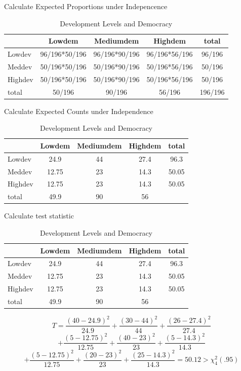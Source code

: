 \documentclass{beamer}
\numberwithin{equation}{section}
\begin{document}
\begin{frame}{Calculate Expected Proportions under Indepencence}
\begin{table}[htdp]
\caption{Development Levels and Democracy}
\begin{center}
\begin{tabular}{l|ccc|c}
\hline
&Lowdem &Mediumdem &Highdem &total\\
\hline
Lowdev& 96/196*50/196&96/196*90/196& 96/196*56/196&96/196\\
Meddev&50/196*50/196&50/196*90/196& 50/196*56/196& 50/196\\
Highdev &50/196*50/196&50/196*90/196& 50/196*56/196& 50/196\\
\hline 
total &50/196& 90/196& 56/196& 196/196
\end{tabular}
\end{center}
\end{table}
\end{frame}

\begin{frame}{Calculate Expected Counts under Independence}
\begin{table}[htdp]
\caption{Development Levels and Democracy}
\begin{center}
\begin{tabular}{l|ccc|c}
\hline
&Lowdem &Mediumdem &Highdem &total\\
\hline
Lowdev& 24.9&44& 27.4&96.3\\
Meddev&12.75&23&14.3&50.05\\
Highdev &12.75&23&14.3&50.05\\
\hline 
total &49.9&90&56&
\end{tabular}
\end{center}
\end{table}
\end{frame}

\begin{frame}{Calculate test statistic}
\begin{table}[htdp]
\caption{Development Levels and Democracy}
\begin{center}
\begin{tabular}{l|ccc|c}
\hline
&Lowdem &Mediumdem &Highdem &total\\
\hline
Lowdev& 24.9&44& 27.4&96.3\\
Meddev&12.75&23&14.3&50.05\\
Highdev &12.75&23&14.3&50.05\\
\hline 
total &49.9&90&56&
\end{tabular}
\end{center}
\end{table}\pause
$$T=\frac{(40-24.9)^2}{24.9}+\frac{(30-44)^2}{44}+\frac{(26-27.4)^2}{27.4}$$\pause
$$+\frac{(5-12.75)^2}{12.75}+\frac{(40-23)^2}{23}+\frac{(5-14.3)^2}{14.3}$$\pause
$$+\frac{(5-12.75)^2}{12.75}+\frac{(20-23)^2}{23}+\frac{(25-14.3)^2}{14.3}=50.12>\chi^2_4(.95)$$

\end{frame}
\end{document}
